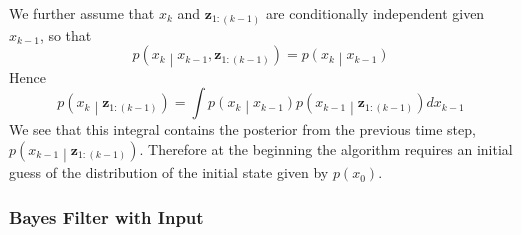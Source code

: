 \documentclass[11pt]{report} %
\begin{document}
We further assume that $x_{k}$ and $\mathbf{z}_{1:\left(k - 1\right)}$ are conditionally independent given $x_{k - 1}$, so that
\begin{equation}
p\left(x_{k}\middle|x_{k - 1}, \mathbf{z}_{1:\left(k - 1\right)}\right) = p\left(x_{k}\middle|x_{k - 1}\right)
\end{equation}
Hence
\begin{equation}
p\left(x_{k}\middle|\mathbf{z}_{1:\left(k - 1\right)}\right) = \int p\left(x_{k}\middle|x_{k - 1}\right)p\left(x_{k - 1}\middle|\mathbf{z}_{1:\left(k - 1\right)}\right)dx_{k - 1}
\end{equation}
We see that this integral contains the posterior from the previous time step, $p\left(x_{k - 1}\middle|\mathbf{z}_{1:\left(k - 1\right)}\right)$. Therefore at the beginning the algorithm requires an initial guess of the distribution of the initial state given by $p\left(x_{0}\right)$. 

\subsubsection{Bayes Filter with Input}
\end{document}
